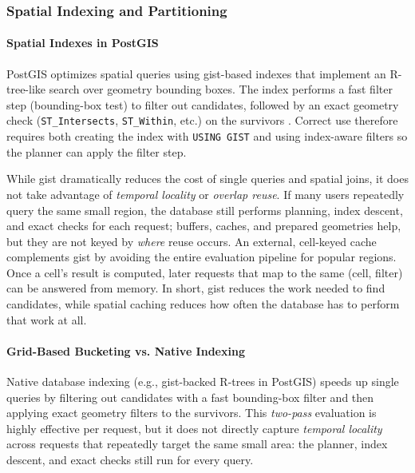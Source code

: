 \subsubsection{Spatial Indexing and Partitioning}

\paragraph{Spatial Indexes in PostGIS}
PostGIS optimizes spatial queries using \ac{gist}-based indexes that implement an R-tree-like search over geometry bounding boxes. The index performs a fast filter step (bounding-box test) to filter out candidates, followed by an exact geometry check (\texttt{ST\_Intersects}, \texttt{ST\_Within}, etc.) on the survivors \cite{PostGIS_Indexing}. Correct use therefore requires both creating the index with \texttt{USING GIST} and using index-aware filters so the planner can apply the filter step. 

While \ac{gist} dramatically reduces the cost of single queries and spatial joins, it does not take advantage of \emph{temporal locality} or \emph{overlap reuse}. If many users repeatedly query the same small region, the database still performs planning, index descent, and exact checks for each request; buffers, caches, and prepared geometries help, but they are not keyed by \emph{where} reuse occurs. An external, cell-keyed cache complements \ac{gist} by avoiding the entire evaluation pipeline for popular regions. Once a cell’s result is computed, later requests that map to the same (cell, filter) can be answered from memory. In short, \ac{gist} reduces the work needed to find candidates, while spatial caching reduces how often the database has to perform that work at all.

\paragraph{Grid-Based Bucketing vs. Native Indexing}
Native database indexing (e.g., \ac{gist}-backed R-trees in PostGIS) speeds up single queries by filtering out candidates with a fast bounding-box filter and then applying exact geometry filters to the survivors. This \emph{two-pass} evaluation is highly effective per request, but it does not directly capture \emph{temporal locality} across requests that repeatedly target the same small area: the planner, index descent, and exact checks still run for every query.

